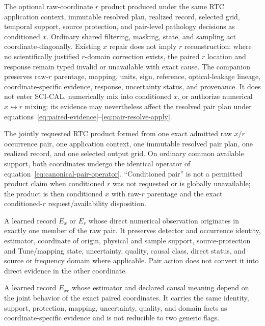 \begin{description}[style=nextline,leftmargin=1em,labelindent=0pt,
  labelwidth=0pt,labelsep=0pt]
\item[SCI-RTC-DEF-039 -- Conditioned-$r$ paired companion.]
The optional raw-coordinate $r$ product produced under the same RTC
application context, immutable resolved plan, realized record, selected grid,
temporal support, source protection, and pair-level pathology decisions as
conditioned $x$.  Ordinary shared filtering, masking, state, and sampling act
coordinate-diagonally.  Existing $x$ repair does not imply $r$ reconstruction:
where no scientifically justified $r$-domain correction exists, the paired
$r$ location and response remain typed invalid or unavailable with exact
cause.  The companion preserves raw-$r$ parentage, mapping, units, sign,
reference, optical-leakage lineage, coordinate-specific evidence, response,
uncertainty status, and provenance.  It does not enter SCI-CAL, numerically
mix into conditioned $x$, or authorize numerical $x\leftrightarrow r$ mixing;
its evidence may nevertheless affect the resolved pair plan under
equations~\eqref{eq:paired-evidence}--\eqref{eq:pair-resolve-apply}.

\item[SCI-RTC-DEF-040 -- Canonical conditioned pair.]
The jointly requested RTC product formed from one exact admitted raw
$x/r$ occurrence pair, one application context, one immutable resolved pair
plan, one realized record, and one selected output grid.  On ordinary common
available support, both coordinates undergo the identical operator of
equation~\eqref{eq:canonical-pair-operator}.  ``Conditioned pair'' is not a
permitted product claim when conditioned $r$ was not requested or is globally
unavailable; the product is then conditioned $x$ with raw-$r$ parentage and
the exact conditioned-$r$ request/availability disposition.

\item[SCI-RTC-DEF-041 -- Coordinate-specific evidence.]
A learned record $E_x$ or $E_r$ whose direct numerical observation originates
in exactly one member of the raw pair.  It preserves detector and occurrence
identity, estimator, coordinate of origin, physical and sample support,
source-protection and Tune/mapping state, uncertainty, quality, causal class,
direct status, and source or frequency domain where applicable.  Pair action
does not convert it into direct evidence in the other coordinate.

\item[SCI-RTC-DEF-042 -- Joint paired evidence.]
A learned record $E_{xr}$ whose estimator and declared causal meaning depend
on the joint behavior of the exact paired coordinates.  It carries the same
identity, support, protection, mapping, uncertainty, quality, and domain facts
as coordinate-specific evidence and is not reducible to two generic flags.


\end{description}
